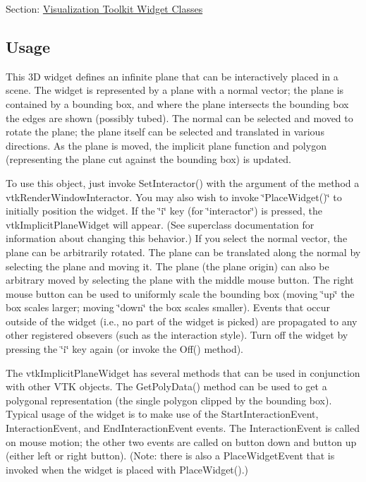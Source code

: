 Section\-: \hyperlink{sec_vtkwidgets}{Visualization Toolkit Widget Classes} \hypertarget{vtkwidgets_vtkxyplotwidget_Usage}{}\subsection{Usage}\label{vtkwidgets_vtkxyplotwidget_Usage}
This 3\-D widget defines an infinite plane that can be interactively placed in a scene. The widget is represented by a plane with a normal vector; the plane is contained by a bounding box, and where the plane intersects the bounding box the edges are shown (possibly tubed). The normal can be selected and moved to rotate the plane; the plane itself can be selected and translated in various directions. As the plane is moved, the implicit plane function and polygon (representing the plane cut against the bounding box) is updated.

To use this object, just invoke Set\-Interactor() with the argument of the method a vtk\-Render\-Window\-Interactor. You may also wish to invoke \char`\"{}\-Place\-Widget()\char`\"{} to initially position the widget. If the \char`\"{}i\char`\"{} key (for \char`\"{}interactor\char`\"{}) is pressed, the vtk\-Implicit\-Plane\-Widget will appear. (See superclass documentation for information about changing this behavior.) If you select the normal vector, the plane can be arbitrarily rotated. The plane can be translated along the normal by selecting the plane and moving it. The plane (the plane origin) can also be arbitrary moved by selecting the plane with the middle mouse button. The right mouse button can be used to uniformly scale the bounding box (moving \char`\"{}up\char`\"{} the box scales larger; moving \char`\"{}down\char`\"{} the box scales smaller). Events that occur outside of the widget (i.\-e., no part of the widget is picked) are propagated to any other registered obsevers (such as the interaction style). Turn off the widget by pressing the \char`\"{}i\char`\"{} key again (or invoke the Off() method).

The vtk\-Implicit\-Plane\-Widget has several methods that can be used in conjunction with other V\-T\-K objects. The Get\-Poly\-Data() method can be used to get a polygonal representation (the single polygon clipped by the bounding box). Typical usage of the widget is to make use of the Start\-Interaction\-Event, Interaction\-Event, and End\-Interaction\-Event events. The Interaction\-Event is called on mouse motion; the other two events are called on button down and button up (either left or right button). (Note\-: there is also a Place\-Widget\-Event that is invoked when the widget is placed with Place\-Widget().)

